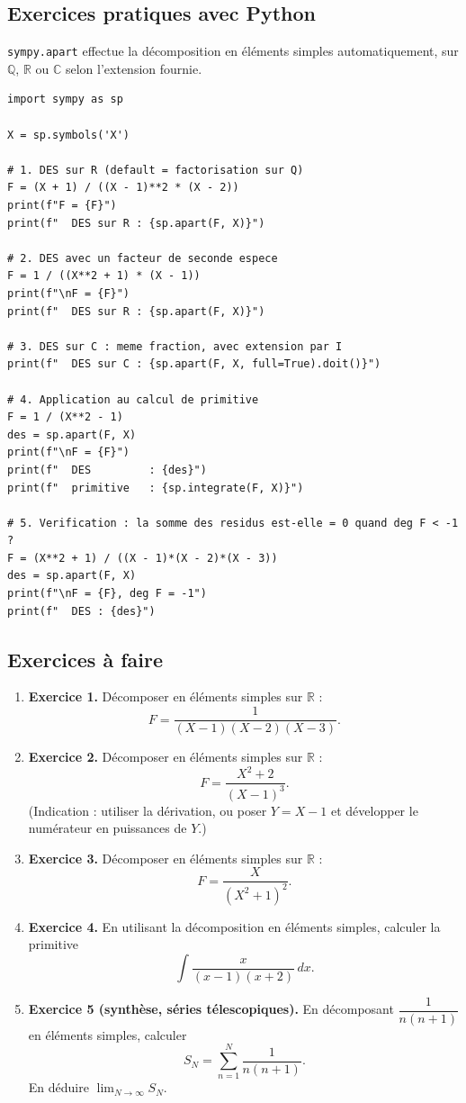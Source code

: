 \documentclass[12pt,a4paper]{report}
\theoremstyle{definition}
\theoremstyle{remark}
\begin{document}
\subsection{Exercices pratiques avec Python}
\texttt{sympy.apart} effectue la décomposition en éléments simples automatiquement, sur $\mathbb{Q}$, $\mathbb{R}$ ou $\mathbb{C}$ selon l'extension fournie.

\begin{lstlisting}
import sympy as sp

X = sp.symbols('X')

# 1. DES sur R (default = factorisation sur Q)
F = (X + 1) / ((X - 1)**2 * (X - 2))
print(f"F = {F}")
print(f"  DES sur R : {sp.apart(F, X)}")

# 2. DES avec un facteur de seconde espece
F = 1 / ((X**2 + 1) * (X - 1))
print(f"\nF = {F}")
print(f"  DES sur R : {sp.apart(F, X)}")

# 3. DES sur C : meme fraction, avec extension par I
print(f"  DES sur C : {sp.apart(F, X, full=True).doit()}")

# 4. Application au calcul de primitive
F = 1 / (X**2 - 1)
des = sp.apart(F, X)
print(f"\nF = {F}")
print(f"  DES         : {des}")
print(f"  primitive   : {sp.integrate(F, X)}")

# 5. Verification : la somme des residus est-elle = 0 quand deg F < -1 ?
F = (X**2 + 1) / ((X - 1)*(X - 2)*(X - 3))
des = sp.apart(F, X)
print(f"\nF = {F}, deg F = -1")
print(f"  DES : {des}")
\end{lstlisting}

\subsection{Exercices à faire}
\begin{enumerate}
    \item \textbf{Exercice 1.} Décomposer en éléments simples sur $\mathbb{R}$ :
    \[ F = \frac{1}{(X - 1)(X - 2)(X - 3)}. \]
    \item \textbf{Exercice 2.} Décomposer en éléments simples sur $\mathbb{R}$ :
    \[ F = \frac{X^2 + 2}{(X - 1)^3}. \]
    (Indication : utiliser la dérivation, ou poser $Y = X - 1$ et développer le numérateur en puissances de $Y$.)
    \item \textbf{Exercice 3.} Décomposer en éléments simples sur $\mathbb{R}$ :
    \[ F = \frac{X}{(X^2 + 1)^2}. \]
    \item \textbf{Exercice 4.} En utilisant la décomposition en éléments simples, calculer la primitive
    \[ \int \frac{x}{(x - 1)(x + 2)}\, dx. \]
    \item \textbf{Exercice 5 (synthèse, séries télescopiques).} En décomposant $\dfrac{1}{n(n + 1)}$ en éléments simples, calculer
    \[ S_N = \sum_{n=1}^{N} \frac{1}{n(n + 1)}. \]
    En déduire $\lim_{N \to \infty} S_N$.
\end{enumerate}
\end{document}
